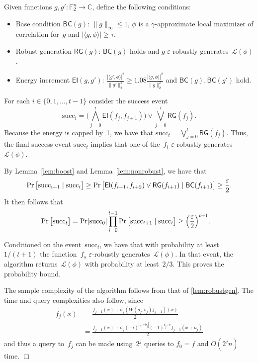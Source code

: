 \documentclass[11pt]{amsart}
\renewcommand{\Pr}{\mathop{\mbox{\rm Pr}}}
\newcommand{\C}{\mathbb{C}} %
\newcommand{\F}{\mathbb{F}} %
\newcommand{\eps}{\varepsilon}
\theoremstyle{plain}
\theoremstyle{definition}
\theoremstyle{remark}
\renewenvironment{proof}[1][]{
    	\begin{trivlist}
     	\item[\hspace{\labelsep}{\em\noindent Proof#1:\/}]}
     	{{\hfill$\Box$}
    	\end{trivlist}
  }
\begin{document}
\begin{proof}
Given functions $g,g':\F_2^n\to \C$, define the following conditions:
\begin{itemize}
    \item Base condition $\mathsf{BC}(g)$: $\|g\|_\infty\leq 1$, $\phi$ is a $\gamma$-approximate local maximizer of correlation for~$g$ and $|\langle g,\phi\rangle| \geq \tau$.
    \item Robust generation $\mathsf{RG}(g)$: $\mathsf{BC}(g)$ holds and $g$ $\eps$-robustly generates~$\mathcal L(\phi)$.
    \item Energy increment $\mathsf{EI}(g,g')$: $\frac{|\langle g',\phi\rangle|^2}{\|g'\|_2^2} \geq 1.08\frac{|\langle g,\phi\rangle|^2}{\|g\|_2^2}$ and $\mathsf{BC}(g), \mathsf{BC}(g')$ hold.
\end{itemize}

For each $i\in\{0,1,\dots,t-1\}$ consider the success event 
\begin{equation*}
    \mathrm{succ}_i = \Big(\bigwedge_{j=0}^{i}\mathsf{EI}(f_j,f_{j+1})\Big)
    \vee
    \bigvee_{j=0}^i\mathsf{RG}(f_j).
\end{equation*}
Because the energy is capped by~1, we have that $\mathrm{succ}_t = \bigvee_{j=0}^t\mathsf{RG}(f_j)$.
Thus, the final success event $\mathrm{succ}_t$ implies that one of the~$f_i$ $\eps$-robustly generates~$\mathcal L(\phi)$.

By Lemma~\ref{lem:boost} and Lemma~\ref{lem:nonrobust}, we have that 
\begin{equation*}
    \Pr\big[\mathrm{succ}_{i+1}\mid\mathrm{succ}_i\big]
    \geq\Pr\big[\mathsf{EI}(f_{i+1},f_{i+2})\vee \mathsf{RG}(f_{i+1})\mid \mathsf{BC}(f_{i+1})\big]\geq \frac{\eps}{2}.
\end{equation*}
It then follows that
\begin{align*}
    \Pr\big[\mathrm{succ}_t\big]
    &=
    \Pr[\mathrm{succ}_0]\prod_{i=0}^{t-1}\Pr\big[\mathrm{succ}_{i+1}\mid\mathrm{succ}_i\big] \geq \Big(\frac{\eps}{2}\Big)^{t+1}.
\end{align*}

Conditioned on the event~$\mathrm{succ}_t$, we have that with probability at least $1/(t+1)$ the function~$f_s$ $\eps$-robustly generates~$\mathcal L(\phi)$.
In that event, the algorithm returns~$\mathcal L(\phi)$ with probability at least~$2/3$.
This proves the probability bound.

The sample complexity of the algorithm follows from that of \cref{lem:robustgen}.
The time and query complexities also follow, since
\begin{align*}
    f_j(x) &= \frac{f_{j-1}(x) + \sigma_j (W(a_j, b_j)f_{j-1})(x)}{2} \\
    &= \frac{f_{j-1}(x) + \sigma_j (-i)^{|a_j\circ b_j|}(-1)^{b_j\cdot x} f_{j-1}(x+a_j)}{2}
\end{align*}
and thus a query to~$f_j$ can be made using~$2^j$ queries to $f_0=f$ and $O(2^j n)$ time.
\end{proof}
\end{document}
